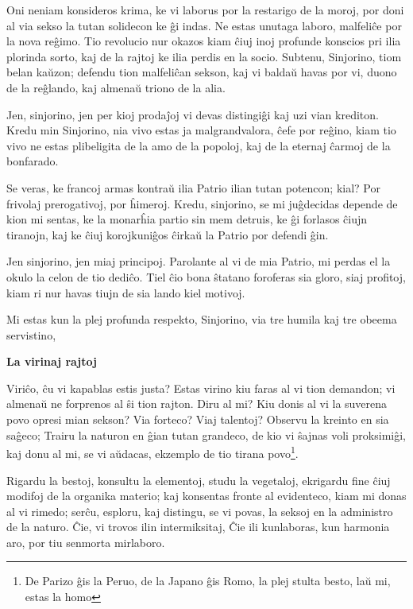 \documentclass{book}
\newcommand{\eble}[1]{{\color{blue}#1}}
\begin{document}
Oni neniam konsideros \eble{krima}, ke vi laborus por la restarigo de la
moroj, por doni al via sekso la tutan solidecon ke ĝi indas. Ne estas
\eble{unutaga} laboro, malfeliĉe por la nova reĝimo. Tio revolucio nur
okazos kiam ĉiuj inoj profunde konscios pri ilia plorinda sorto, kaj de
la rajtoj ke ilia perdis en la socio. Subtenu, Sinjorino, tiom belan
kaŭzon; defendu tion malfeliĉan sekson, kaj vi baldaŭ havas por vi, duono
de la reĝlando, kaj almenaŭ triono de la alia.

Jen, sinjorino, jen per kioj prodaĵoj vi devas distingiĝi kaj uzi vian
\eble{krediton}. Kredu min Sinjorino, nia vivo estas ja malgrandvalora,
ĉefe por reĝino, kiam tio vivo ne estas plibeligita de la amo de la
popoloj, kaj de la eternaj ĉarmoj de la bonfarado.

Se veras, ke francoj armas kontraŭ ilia Patrio ilian tutan potencon;
kial? Por frivolaj prerogativoj, por ĥimeroj. Kredu, sinjorino, se mi
juĝdecidas depende de kion mi \eble{sentas}, ke la monarĥia partio sin
mem detruis, ke ĝi forlasos ĉiujn tiranojn, kaj ke ĉiuj korojkuniĝos
ĉirkaŭ la Patrio por defendi ĝin.

Jen sinjorino, jen miaj principoj. Parolante al vi de mia Patrio, mi
perdas el la okulo la celon de tio dediĉo. Tiel ĉio bona ŝtatano
foroferas sia gloro, siaj profitoj, kiam ri nur havas tiujn de sia lando
kiel motivoj.

Mi estas kun la plej profunda respekto, Sinjorino, via tre humila kaj tre
obeema servistino,

\vspace{2em}
\noindent\textbf{La virinaj rajtoj}
\vspace{1em}

Viriĉo, ĉu vi kapablas estis justa? Estas virino kiu faras al vi tion
demandon; vi almenaŭ ne forprenos al ŝi tion rajton. Diru al mi? Kiu
donis al vi la suverena povo opresi mian sekson? Via forteco? Viaj
talentoj? Observu la kreinto en sia saĝeco; Trairu la naturon en ĝian
tutan grandeco, de kio vi ŝajnas voli proksimiĝi, kaj donu al mi, se
vi aŭdacas, ekzemplo de tio tirana povo\footnote{De Parizo ĝis la
Peruo, de la Japano ĝis Romo, la plej stulta besto, laŭ mi, estas la homo}.

Rigardu la bestoj, konsultu la elementoj, studu la vegetaloj, ekrigardu
fine ĉiuj modifoj de la organika materio; kaj konsentas fronte al
evidenteco, kiam mi donas al vi rimedo; serĉu, esploru, kaj distingu, se
vi povas, la seksoj en la administro de la naturo. Ĉie, vi trovos ilin
intermiksitaj, Ĉie ili kunlaboras, kun harmonia aro, por tiu senmorta
mirlaboro.
\end{document}

